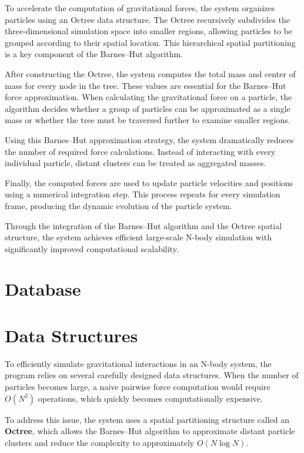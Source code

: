 To accelerate the computation of gravitational forces, the system organizes particles using an Octree data structure. The Octree recursively subdivides the three-dimensional simulation space into smaller regions, allowing particles to be grouped according to their spatial location. This hierarchical spatial partitioning is a key component of the Barnes--Hut algorithm.

After constructing the Octree, the system computes the total mass and center of mass for every node in the tree. These values are essential for the Barnes--Hut force approximation. When calculating the gravitational force on a particle, the algorithm decides whether a group of particles can be approximated as a single mass or whether the tree must be traversed further to examine smaller regions.

Using this Barnes--Hut approximation strategy, the system dramatically reduces the number of required force calculations. Instead of interacting with every individual particle, distant clusters can be treated as aggregated masses.

Finally, the computed forces are used to update particle velocities and positions using a numerical integration step. This process repeats for every simulation frame, producing the dynamic evolution of the particle system.

Through the integration of the Barnes--Hut algorithm and the Octree spatial structure, the system achieves efficient large-scale N-body simulation with significantly improved computational scalability.
\section{Database}
\section{Data Structures}

To efficiently simulate gravitational interactions in an N-body system, the program relies on several carefully designed data structures. When the number of particles becomes large, a naive pairwise force computation would require $O(N^2)$ operations, which quickly becomes computationally expensive.

To address this issue, the system uses a spatial partitioning structure called an \textbf{Octree}, which allows the Barnes–Hut algorithm to approximate distant particle clusters and reduce the complexity to approximately $O(N\log N)$.

